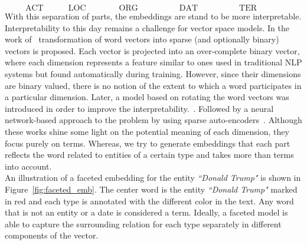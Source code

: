 $$ \quad  \mathrm{ACT} \quad  \qquad  \mathrm{LOC}\qquad \qquad \mathrm{ORG}\qquad \quad \qquad \mathrm{DAT}\qquad \quad  \qquad  \mathrm{TER}\qquad \qquad$$
\mathcenter
With this separation of parts, the embeddings are stand to be more interpretable. Interpretability to this day remains a challenge for vector space models. In the work of~ transformation of word vectors into sparse (and optionally binary) vectors is proposed. Each vector is projected into an over-complete binary vector, where each dimension represents a feature similar to ones used in traditional NLP systems but found automatically during training. However, since their dimensions are binary valued, there is no notion of the extent to which a word participates in a particular dimension. Later, a model based on rotating the word vectors was introduced in order to improve the interpretability.~. Followed by a neural network-based approach to the problem by using sparse auto-encoders~. Although these works shine some light on the potential meaning of each dimension, they focus purely on terms. Whereas, we try to generate embeddings that each part reflects the word related to entities of a certain type and takes more than terms into account. \\
An illustration of a faceted embedding for the entity \emph{``Donald Trump"} is shown in Figure~\ref{fig:faceted_emb}. The center word is the entity \emph{``Donald Trump"} marked in red and each type is annotated with the different color in the text. Any word that is not an entity or a date is considered a term. Ideally, a faceted model is able to capture the surrounding relation for each type separately in different components of the vector. \\
